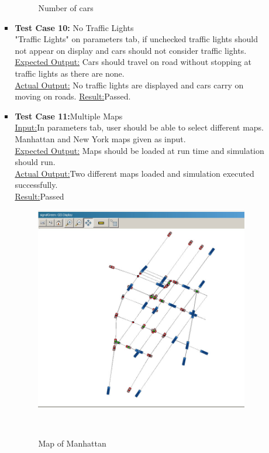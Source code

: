 \documentclass[11pt]{article}
\begin{document}
\begin{enumerate}
\begin{itemize}
\begin{itemize}
\begin{figure}[h]
\begin{center}
\caption{Number of cars}
\end{center}
\end{figure}
\item \textbf{Test Case 10:} No Traffic Lights\hfill \\
"Traffic Lights" on parameters tab, if unchecked traffic lights should not appear on display and cars should not consider traffic lights.\hfill \\
\underline{Expected Output:} Cars should travel on road without stopping at traffic lights as there are none.\hfill \\
\underline{Actual Output:} No traffic lights are displayed and cars carry on moving on roads.
\underline{Result:}Passed.
\item \textbf{Test Case 11:}Multiple Maps\hfill \\
\underline{Input:}In parameters tab, user should be able to select different maps. Manhattan and New York maps given as input. \hfill \\
\underline{Expected Output:} Maps should be loaded at run time and simulation should run.\hfill \\
\underline{Actual Output:}Two different maps loaded and simulation executed successfully.\hfill \\
\underline{Result:}Passed
\begin{figure}[h]
\begin{center}
\includegraphics[scale=0.3]{manhattan_section}
\caption{Map of Manhattan}\hfill \\
\end{center}
\end{figure}\hfill \\
\end{itemize}


\end{itemize}
\end{enumerate}
\end{document}
